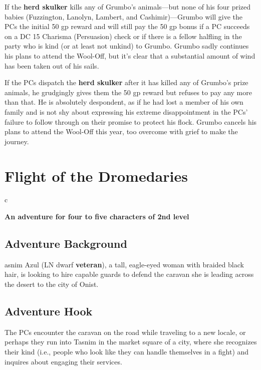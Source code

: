 \documentclass[10pt,a4paper,twoside,bg=print,twocolumn,openany,nodeprecatedcode]{dndbook}
\begin{document}
If the \textbf{herd skulker} kills any of Grumbo's animals—but none of his four prized babies (Fuzzington, Lanolyn, Lambert, and Cashimir)—Grumbo will give the PCs the initial 50 gp reward and will still pay the 50 gp bonus if a PC succeeds on a DC 15 Charisma (Persuasion) check or if there is a fellow halfling in the party who is kind (or at least not unkind) to Grumbo. Grumbo sadly continues his plans to attend the Wool-Off, but it's clear that a substantial amount of wind has been taken out of his sails.

If the PCs dispatch the \textbf{herd skulker} after it has killed any of Grumbo's prize animals, he grudgingly gives them the 50 gp reward but refuses to pay any more than that. He is absolutely despondent, as if he had lost a member of his own family and is not shy about expressing his extreme disappointment in the PCs' failure to follow through on their promise to protect his flock. Grumbo cancels his plans to attend the Wool-Off this year, too overcome with grief to make the journey.

\chapter{Flight of the Dromedaries}

\begin{DndTable}{c}

\textbf{An adventure for four to five characters of 2nd level}\\
\end{DndTable}

\section{Adventure Background}
asnim Azul (LN dwarf \textbf{veteran}), a tall, eagle-eyed woman with braided black hair, is looking to hire capable guards to defend the caravan she is leading across the desert to the city of Onist.


\section{Adventure Hook}
The PCs encounter the caravan on the road while traveling to a new locale, or perhaps they run into Tasnim in the market square of a city, where she recognizes their kind (i.e., people who look like they can handle themselves in a fight) and inquires about engaging their services.
\end{document}
